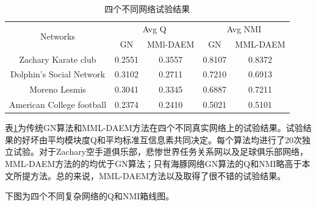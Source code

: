 \documentclass[a4paper,12pt,openany,oneside,utf-8]{ctexbook}
\begin{document}
	\begin{table}[H]
	\centering
	\caption{四个不同网络试验结果}
	\label{t6}
    \begin{tabular}{ccccc}
    \hline
    \multirow{2}{*}{Networks} & \multicolumn{2}{c}{Avg Q} & \multicolumn{2}{c}{Avg NMI} \\ \cline{2-5} 
                              & GN         & MMl-DAEM     & GN          & MML-DAEM      \\ \hline
    Zachary Karate club       & 0.2551     & 0.3557       & 0.8107      & 0.8372        \\ \hline
    Dolphin's Social Network  & 0.3102     & 0.2711       & 0.7210      & 0.6913        \\ \hline
    Moreno Lesmis             & 0.3041     & 0.3345       & 0.6887      & 0.7211        \\ \hline
    American College football & 0.2374     & 0.2410       & 0.5021      & 0.5101        \\ \hline
    \end{tabular}
    \end{table}
	
	表\ref{t6}为传统GN算法和MML-DAEM方法在四个不同真实网络上的试验结果。试验结果的好坏由平均模块度Q和平均标准互信息素共同决定。每个算法均进行了20次独立试验。对于Zachary空手道俱乐部，悲惨世界任务关系网以及足球俱乐部网络，MML-DAEM方法的的均优于GN算法；只有海豚网络GN算法的Q和NMI略高于本文所提方法。总的来说，MML-DAEM方法以及取得了很不错的试验结果。
	
	下图为四个不同复杂网络的Q和NMI箱线图。
	
\end{document}
